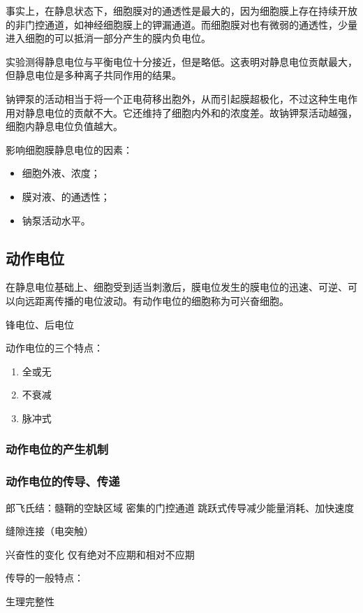 事实上，在静息状态下，细胞膜对的通透性是最大的，因为细胞膜上存在持续开放的非门控通道，如神经细胞膜上的钾漏通道。而细胞膜对也有微弱的通透性，少量进入细胞的可以抵消一部分产生的膜内负电位。

实验测得静息电位与平衡电位十分接近，但是略低。这表明对静息电位贡献最大，但静息电位是多种离子共同作用的结果。

钠钾泵的活动相当于将一个正电荷移出胞外，从而引起膜超极化，不过这种生电作用对静息电位的贡献不大。它还维持了细胞内外和的浓度差。故钠钾泵活动越强，细胞内静息电位负值越大。

影响细胞膜静息电位的因素：
\begin{itemize}
	\item 细胞外液、浓度；
	\item 膜对液、的通透性；
	\item 钠泵活动水平。
\end{itemize}

\subsection{动作电位}

在静息电位基础上、细胞受到适当刺激后，膜电位发生的膜电位的迅速、可逆、可以向远距离传播的电位波动。有动作电位的细胞称为可兴奋细胞。

锋电位、后电位

动作电位的三个特点：
\begin{enumerate}
	\item 全或无
	\item 不衰减
	\item 脉冲式
\end{enumerate}

\subsubsection{动作电位的产生机制}

\subsubsection{动作电位的传导、传递}

郎飞氏结：髓鞘的空缺区域 密集的门控通道  跳跃式传导减少能量消耗、加快速度

缝隙连接（电突触）

兴奋性的变化 仅有绝对不应期和相对不应期

传导的一般特点：
\begin{description}
	\item[生理完整性]
\end{description}

